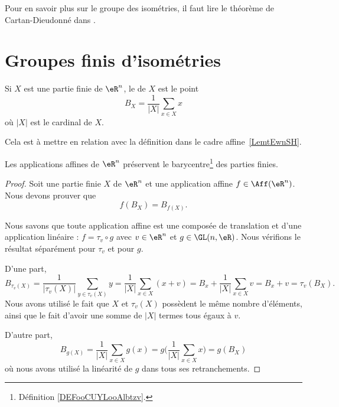 Pour en savoir plus sur le groupe des isométries, il faut lire le théorème de Cartan-Dieudonné dans \cite{JGAdTA}.

\section{Groupes finis d'isométries}

\begin{definition}      \label{DEFooCUYLooAlbtzv}
    Si \( X\) est une partie finie de \( \eR^n\), le  de \( X\) est le point
    \begin{equation}
        B_X=\frac{1}{ | X | }\sum_{x\in X}x
    \end{equation}
    où \( | X |\) est le cardinal de \( X\).
\end{definition}
Cela est à mettre en relation avec la définition dans le cadre affine~\ref{LemtEwnSH}.

\begin{lemma}        \label{LEMooSEZYooYceLIb}
    Les applications affines de \( \eR^n\) préservent le barycentre\footnote{Définition \ref{DEFooCUYLooAlbtzv}.} des parties finies.
\end{lemma}

\begin{proof}
    Soit une partie finie \( X\) de \( \eR^n\) et une application affine \( f\in\Aff(\eR^n)\). Nous devons prouver que
    \begin{equation}
        f(B_X)=B_{f(X)}.
    \end{equation}

    Nous savons que toute application affine est une composée de translation et d'une application linéaire : \( f=\tau_v\circ g\) avec \( v\in \eR^n\) et \( g\in \GL(n,\eR)\). Nous vérifions le résultat séparément pour \( \tau_v\) et pour \( g\).

    D'une part,
    \begin{equation}
        B_{\tau_v(X)}=\frac{1}{ | \tau_v(X) | }\sum_{y\in \tau_v(X)}y=\frac{1}{ | X | }\sum_{x\in X}(x+v)=B_x+\frac{1}{ | X | }\sum_{x\in X}v=B_x+v=\tau_v(B_X).
    \end{equation}
    Nous avons utilisé le fait que \( X\) et \( \tau_v(X)\) possèdent le même nombre d'éléments, ainsi que le fait d'avoir une somme de \( | X |\) termes tous égaux à \( v\).

    D'autre part,
    \begin{equation}
        B_{g(X)}=\frac{1}{ | X | }\sum_{x\in X}g(x)=g\big( \frac{1}{ |X | }\sum_{x\in X}x \big)=g(B_X)
    \end{equation}
    où nous avons utilisé la linéarité de \( g\) dans tous ses retranchements.
\end{proof}

